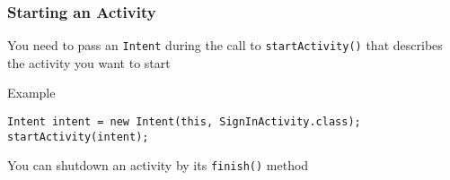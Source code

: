 %
%

\begin{frame}[fragile]
  \frametitle{Starting an Activity}
  

  You need to pass an \texttt{Intent} during the call to
  \lstinline{startActivity()} that describes the activity you want to
  start

  \begin{exampleblock}{Example}
\begin{lstlisting}
Intent intent = new Intent(this, SignInActivity.class);
startActivity(intent);
\end{lstlisting}
  \end{exampleblock}

  You can shutdown an activity by its \lstinline{finish()} method

\end{frame}

